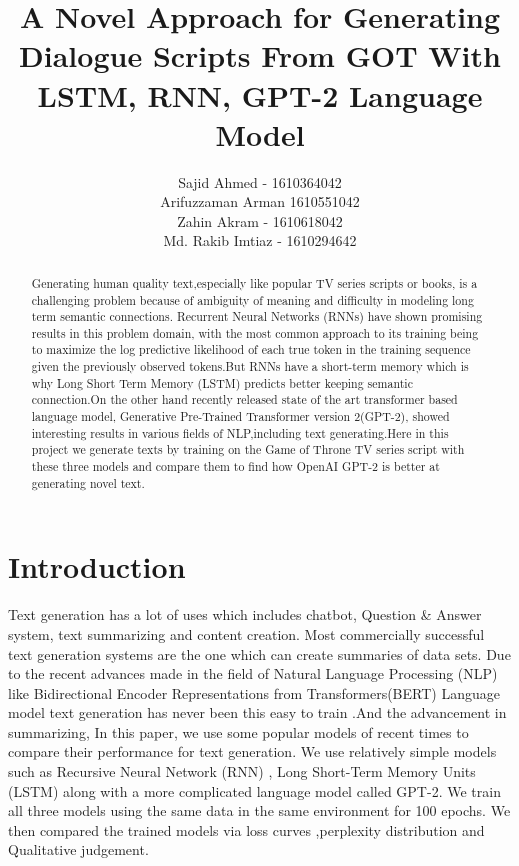 \documentclass[11pt,a4paper]{article}
\title{A Novel Approach for Generating Dialogue Scripts From GOT With LSTM, RNN, GPT-2 Language Model}
\author{ Sajid Ahmed - 1610364042\\
Arifuzzaman Arman 1610551042\\
Zahin Akram - 1610618042\\
Md. Rakib Imtiaz - 1610294642}
\date{}
\begin{document}
\maketitle

\begin{abstract}

Generating human quality text,especially like popular TV series scripts or books, is a challenging problem because of ambiguity of meaning and difficulty in modeling long term semantic connections. Recurrent Neural Networks (RNNs)\cite{mikolov2010recurrent} have shown promising results in this problem domain,
with the most common approach to its training being to maximize the log predictive likelihood of each true token in the training sequence given the previously observed tokens.But RNNs have a short-term memory which is why Long Short Term Memory (LSTM)\cite{gers1999learning} predicts better keeping semantic connection.On the other hand recently released state of the art transformer based language model, Generative Pre-Trained Transformer version 2(GPT-2), showed interesting results in various fields of NLP,including text generating\cite{radford2019language}.Here in this project we generate texts by training on the Game of Throne TV series script with these three models and compare them to find  how OpenAI GPT-2 is better at generating novel text.

\end{abstract}



\section{Introduction}
Text generation has a lot of uses which includes chatbot, Question \& Answer system, text summarizing and content creation. Most commercially successful text generation systems are the one which can create summaries of data sets. Due to the recent advances made in the field of Natural Language Processing (NLP) like Bidirectional Encoder Representations from Transformers(BERT) Language model\cite{devlin2018bert} text generation has never been this easy to train .And the advancement in  summarizing\cite{salton1994automatic}, In this paper, we use some popular models of recent times to compare their performance for text generation. We use relatively simple models such as Recursive Neural Network (RNN) \cite{mikolov2010recurrent}, Long Short-Term Memory Units (LSTM)\cite{gers1999learning} along with a more complicated language model called GPT-2\cite{radford2019language}. We train all three models using the same data in the same environment for 100 epochs. We then compared the trained models via loss curves ,perplexity distribution and Qualitative judgement.
\end{document}
